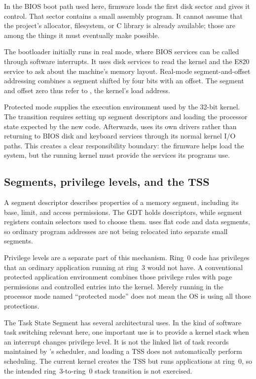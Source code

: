 \documentclass[11pt,a4paper]{scrartcl}
\newcommand{\code}[1]{\texttt{\detokenize{#1}}}
\begin{document}
In the BIOS boot path used here, firmware loads the first disk sector
and gives it control. That sector contains a small assembly program. It
cannot assume that the project's allocator, filesystem, or C library is
already available; those are among the things it must eventually make
possible.

The bootloader initially runs in real mode, where BIOS services can be
called through software interrupts. It uses disk services to read the
kernel and the E820 service to ask about the machine's memory layout.
Real-mode segment-and-offset addressing combines a segment shifted by
four bits with an offset. The segment \code{0x1000} and offset zero thus
refer to \code{0x10000}, the kernel's load address.

Protected mode supplies the execution environment used by the 32-bit
kernel. The transition requires setting up segment descriptors and
loading the processor state expected by the new code. Afterwards,
\code{mboot} uses its own drivers rather than returning to BIOS disk and
keyboard services through its normal kernel I/O paths. This creates a
clear responsibility boundary: the firmware helps load the system, but
the running kernel must provide the services its programs use.

\subsection{Segments, privilege levels, and the TSS}

A segment descriptor describes properties of a memory segment, including
its base, limit, and access permissions. The GDT holds descriptors, while
segment registers contain selectors used to choose them. \code{mboot}
uses flat code and data segments, so ordinary program addresses are not
being relocated into separate small segments.

Privilege levels are a separate part of this mechanism. Ring~0 code has
privileges that an ordinary application running at ring~3 would not have.
A conventional protected application environment combines those privilege
rules with page permissions and controlled entries into the kernel.
Merely running in the processor mode named ``protected mode'' does not
mean the OS is using all those protections.

The Task State Segment has several architectural uses. In the kind of
software task switching relevant here, one important use is to provide
a kernel stack when an interrupt changes privilege level. It is not the
linked list of task records maintained by \code{mboot}'s scheduler, and
loading a TSS does not automatically perform scheduling. The current
kernel creates the TSS but runs applications at ring~0, so the intended
ring~3-to-ring~0 stack transition is not exercised.
\end{document}
